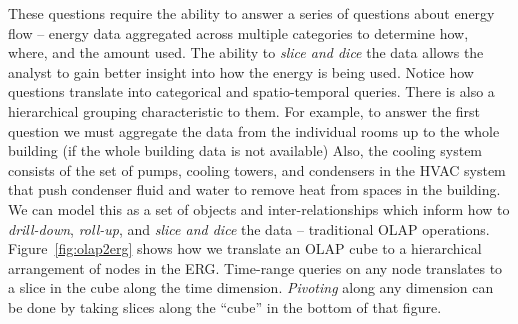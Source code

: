 These questions require the ability to answer a series of questions
about energy flow -- energy data aggregated across multiple categories to determine how, where, and the amount used.  
The ability to \emph{slice and dice} the data allows the analyst to gain better insight into how the energy is being used.
Notice how questions translate into categorical and spatio-temporal queries.
There is also a hierarchical grouping characteristic to them.  For example, to answer the first question we must 
aggregate the data from the individual rooms up to the whole building (if the whole building data is not available)
Also, the cooling system consists of the set of pumps, cooling towers, and condensers in the HVAC system that push condenser
fluid and water to remove heat from spaces in the building.  We can model this as a set of objects and inter-relationships which inform how
to \emph{drill-down}, \emph{roll-up}, and \emph{slice and dice} the data -- traditional OLAP operations.
Figure~\ref{fig:olap2erg} shows how we translate an OLAP cube to a hierarchical arrangement of 
nodes in the ERG.  Time-range queries on any node translates to a slice in the cube along the time dimension.
\emph{Pivoting} along any dimension can be done by taking slices along the ``cube'' in the bottom of that
figure.

